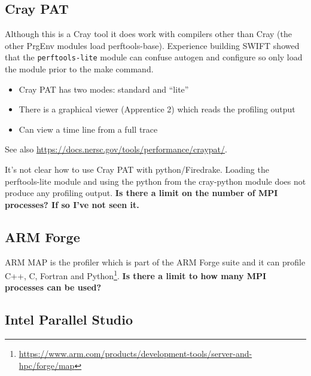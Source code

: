 \documentclass[a4paper,titlepage]{article}
\begin{document}

\subsection{Cray PAT}

Although this is a Cray tool it does work with compilers other than Cray (the other PrgEnv modules load perftools-base). Experience building SWIFT showed that the \texttt{perftools-lite} module can confuse autogen and configure so only load the module prior to the make command. 

\begin{itemize}
\item Cray PAT has two modes: standard and ``lite''
\item There is a graphical viewer (Apprentice 2) which reads the profiling output
\item Can view a time line from a full trace
\end{itemize}
See also \url{https://docs.nersc.gov/tools/performance/craypat/}.

It's not clear how to use Cray PAT with python/Firedrake. Loading the perftools-lite module and using the python from the cray-python module does not produce any profiling output.
\textbf{Is there a limit on the number of MPI processes? If so I've not seen it.}


\subsection{ARM Forge}

ARM MAP is the profiler which is part of the ARM Forge suite and it can profile C++, C, Fortran and Python\footnote{\url{https://www.arm.com/products/development-tools/server-and-hpc/forge/map}}.
\textbf{Is there a limit to how many MPI processes can be used?}


\subsection{Intel Parallel Studio}
\end{document}
